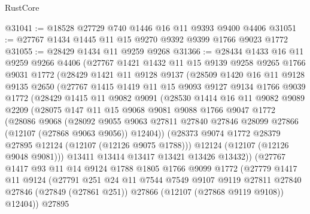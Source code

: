 \begin{lexlean}{RustCore}
\begin{coremodule}
@31041 := @18528 @27729 @740 @1446 @16 @11 @9393 @9400 @4406
@31051 := @27767 @1434 @1445 @11 @15 @9270 @9392 @9399 @1766 @9023 @1772
@31055 := @28429 @1434 @11 @9259 @9268
@31366 := @28434
    @1433
    @16
    @11
    @9259
    @9266
    @4406
    (@27767
      @1421
      @1432
      @11
      @15
      @9139
      @9258
      @9265
      @1766
      @9031
      @1772
      (@28429
        @1421
        @11
        @9128
        @9137
        (@28509
          @1420
          @16
          @11
          @9128
          @9135
          @2650
          (@27767
            @1415
            @1419
            @11
            @15
            @9093
            @9127
            @9134
            @1766
            @9039
            @1772
            (@28429
              @1415
              @11
              @9082
              @9091
              (@28530
                @1414
                @16
                @11
                @9082
                @9089
                @2209
                (@28075
                  @147
                  @11
                  @15
                  @9068
                  @9081
                  @9088
                  @1766
                  @9047
                  @1772
                  (@28086
                    @9068
                    (@28092
                      @9055
                      @9063
                      @27811
                      @27840
                      @27846
                      @28099
                      @27866
                      (@12107 (@27868 @9063 @9056))
                      @12404))
                  (@28373 @9074 @1772 @28379 @27895 @12124 (@12107 (@12126 @9075 @1788)))
                  @12124
                  (@12107 (@12126 @9048 @9081)))
                @13411
                @13414
                @13417
                @13421
                @13426
                @13432))
            (@27767
              @1417
              @93
              @11
              @14
              @9124
              @1788
              @1805
              @1766
              @9099
              @1772
              (@27779
                @1417
                @11
                @9124
                (@27791
                  @251
                  @24
                  @11
                  @7544
                  @7549
                  @9107
                  @9119
                  @27811
                  @27840
                  @27846
                  (@27849 (@27861 @251))
                  @27866
                  (@12107 (@27868 @9119 @9108))
                  @12404))
              @27895

\end{coremodule}
\end{lexlean}

